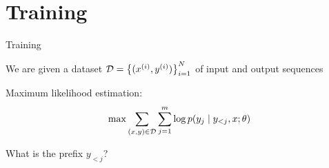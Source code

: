 \documentclass[usenames,dvipsnames,notes,11pt,aspectratio=169,hyperref={colorlinks=true, linkcolor=blue}]{beamer}
\begin{document}
%
%
%

\section{Training}

\begin{frame}
    {Training}

    We are given a dataset $\mathcal{D} = \left\{ (x^{(i)},y^{(i)}) \right\}_{i=1}^N$ of input and output sequences

    Maximum likelihood estimation:\\
    $$
    \max \sum_{(x,y)\in\mathcal{D}} \sum_{j=1}^m \log p(y_j\mid y_{<j}, x; \theta)
    $$
    \pause

    What is the prefix $y_{<j}$?\\[1ex]\pause
\end{frame}
\end{document}
